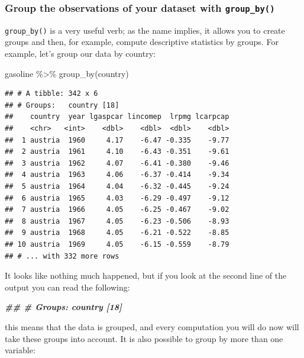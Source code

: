 \documentclass[
]{article}
\newenvironment{Shaded}{\begin{snugshade}}{\end{snugshade}}
\newcommand{\DocumentationTok}[1]{\textcolor[rgb]{0.56,0.35,0.01}{\textbf{\textit{#1}}}}
\newcommand{\FunctionTok}[1]{\textcolor[rgb]{0.00,0.00,0.00}{#1}}
\newcommand{\NormalTok}[1]{#1}
\newcommand{\SpecialCharTok}[1]{\textcolor[rgb]{0.00,0.00,0.00}{#1}}
\begin{document}
\hypertarget{group-the-observations-of-your-dataset-with-group_by}{%
\subsubsection{\texorpdfstring{Group the observations of your dataset with \texttt{group\_by()}}{Group the observations of your dataset with group\_by()}}\label{group-the-observations-of-your-dataset-with-group_by}}

\texttt{group\_by()} is a very useful verb; as the name implies, it allows you to create groups and then,
for example, compute descriptive statistics by groups. For example, let's group our data by
country:

\begin{Shaded}
\begin{Highlighting}[]
\NormalTok{gasoline }\SpecialCharTok{\%\textgreater{}\%}
  \FunctionTok{group\_by}\NormalTok{(country)}
\end{Highlighting}
\end{Shaded}

\begin{verbatim}
## # A tibble: 342 x 6
## # Groups:   country [18]
##    country  year lgaspcar lincomep  lrpmg lcarpcap
##    <chr>   <int>    <dbl>    <dbl>  <dbl>    <dbl>
##  1 austria  1960     4.17    -6.47 -0.335    -9.77
##  2 austria  1961     4.10    -6.43 -0.351    -9.61
##  3 austria  1962     4.07    -6.41 -0.380    -9.46
##  4 austria  1963     4.06    -6.37 -0.414    -9.34
##  5 austria  1964     4.04    -6.32 -0.445    -9.24
##  6 austria  1965     4.03    -6.29 -0.497    -9.12
##  7 austria  1966     4.05    -6.25 -0.467    -9.02
##  8 austria  1967     4.05    -6.23 -0.506    -8.93
##  9 austria  1968     4.05    -6.21 -0.522    -8.85
## 10 austria  1969     4.05    -6.15 -0.559    -8.79
## # ... with 332 more rows
\end{verbatim}

It looks like nothing much happened, but if you look at the second line of the output you can read
the following:

\begin{Shaded}
\begin{Highlighting}[]
\DocumentationTok{\#\# \# Groups:   country [18]}
\end{Highlighting}
\end{Shaded}

this means that the data is grouped, and every computation you will do now will take these groups
into account. It is also possible to group by more than one variable:
\end{document}
